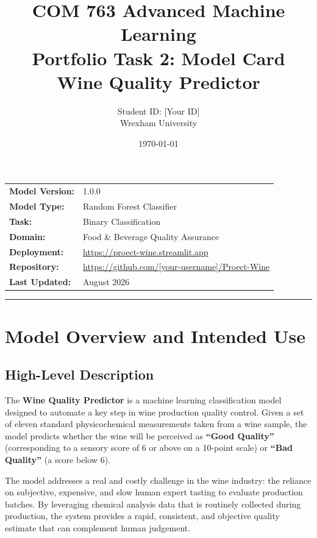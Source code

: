 \documentclass[11pt,a4paper]{article}
\title{%
  \vspace{-1cm}
  \textbf{COM 763 Advanced Machine Learning}\\[0.5em]
  \large Portfolio Task 2: Model Card\\[0.3em]
  \LARGE\bfseries Wine Quality Predictor
}
\author{Student ID: [Your ID] \\ Wrexham University}
\date{\today}
\begin{document}
\maketitle
\thispagestyle{empty}

\vspace{0.5em}
\begin{center}
\begin{tabular}{ll}
  \textbf{Model Version:}   & 1.0.0 \\
  \textbf{Model Type:}      & Random Forest Classifier \\
  \textbf{Task:}            & Binary Classification \\
  \textbf{Domain:}          & Food \& Beverage Quality Assurance \\
  \textbf{Deployment:}      & \url{https://proect-wine.streamlit.app} \\
  \textbf{Repository:}      & \url{https://github.com/[your-username]/Proect-Wine} \\
  \textbf{Last Updated:}    & August 2026 \\
\end{tabular}
\end{center}

\vspace{1em}
\hrule
\vspace{0.5em}

\tableofcontents
\newpage

\section{Model Overview and Intended Use}

\subsection{High-Level Description}

The \textbf{Wine Quality Predictor} is a machine learning classification model designed to automate a key step in wine production quality control. Given a set of eleven standard physicochemical measurements taken from a wine sample, the model predicts whether the wine will be perceived as \textbf{``Good Quality''} (corresponding to a sensory score of 6 or above on a 10-point scale) or \textbf{``Bad Quality''} (a score below 6).

The model addresses a real and costly challenge in the wine industry: the reliance on subjective, expensive, and slow human expert tasting to evaluate production batches. By leveraging chemical analysis data that is routinely collected during production, the system provides a rapid, consistent, and objective quality estimate that can complement human judgement.
\end{document}
